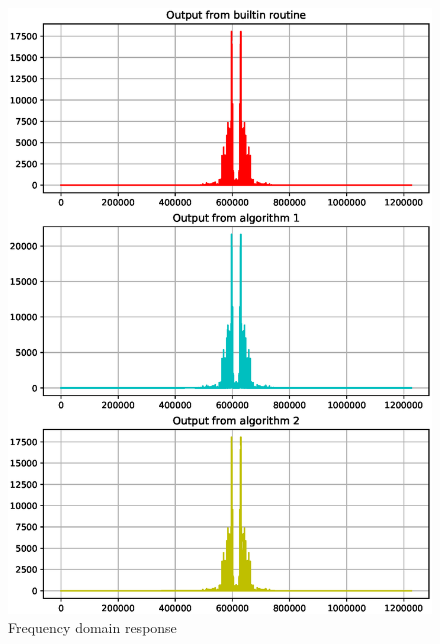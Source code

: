 \documentclass[journal,12pt,twocolumn]{IEEEtran}
\begin{document}
\begin{figure}[!h]
\centering
\includegraphics[width=1.2\columnwidth]{./figs/ee18btech11038_freq.eps}
\caption{Frequency domain response}
\label{fig:Figure2}
\end{figure}
\end{document}
